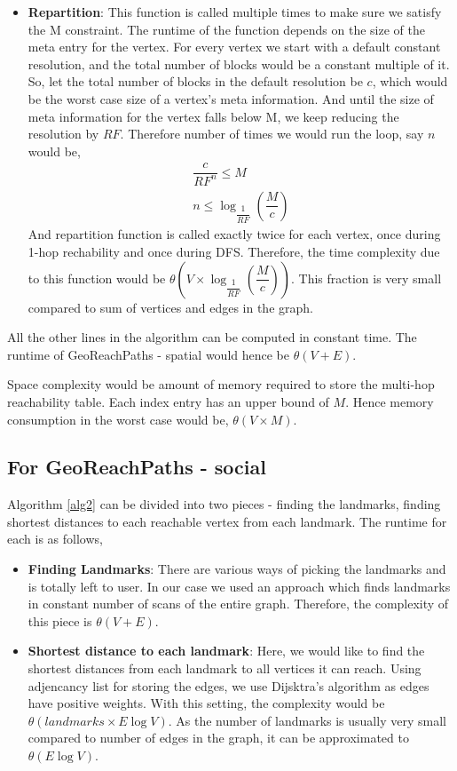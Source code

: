 \begin{itemize}
  \item \textbf{Repartition}: This function is called multiple times to make sure we satisfy the M constraint. The runtime of the function depends on the size of the meta entry for the vertex. For every vertex we start with a default constant resolution, and the total number of blocks would be a constant multiple of it. So, let the total number of blocks in the default resolution be $c$, which would be the worst case size of a vertex's meta information. And until the size of meta information for the vertex falls below M, we keep reducing the resolution by $RF$. Therefore number of times we would run the loop, say $n$ would be,
  \begin{eqnarray*}
  	\dfrac{c}{RF^n} \leq M\\
  	n \leq {\log_{\dfrac{1}{RF}} (\dfrac{M}{c})}
  \end{eqnarray*}
  And repartition function is called exactly twice for each vertex, once during 1-hop rechability and once during DFS. Therefore, the time complexity due to this function would be $\theta(V \times {\log_{\dfrac{1}{RF}} (\dfrac{M}{c})})$. This fraction is very small compared to sum of vertices and edges in the graph.
\end{itemize}

All the other lines in the algorithm can be computed in constant time. The runtime of GeoReachPaths - spatial would hence be $\theta(V + E)$.

Space complexity would be amount of memory required to store the multi-hop reachability table. Each index entry has an upper bound of $M$. Hence memory consumption in the worst case would be, $\theta(V \times M)$.

\subsection{For GeoReachPaths - social}
Algorithm \ref{alg2} can be divided into two pieces - finding the landmarks, finding shortest distances to each reachable vertex from each landmark. The runtime for each is as follows,
\begin{itemize}
	\item \textbf{Finding Landmarks}: There are various ways of picking the landmarks and is totally left to user. In our case we used an approach which finds landmarks in constant number of scans of the entire graph. Therefore, the complexity of this piece is $\theta(V + E)$.
	\item \textbf{Shortest distance to each landmark}: Here, we would like to find the shortest distances from each landmark to all vertices it can reach. Using adjencancy list for storing the edges, we use Dijsktra's algorithm as edges have positive weights. With this setting, the complexity would be $\theta(landmarks \times E\log V)$. As the number of landmarks is usually very small compared to number of edges in the graph, it can be approximated to $\theta(E\log V)$.
\end{itemize}

